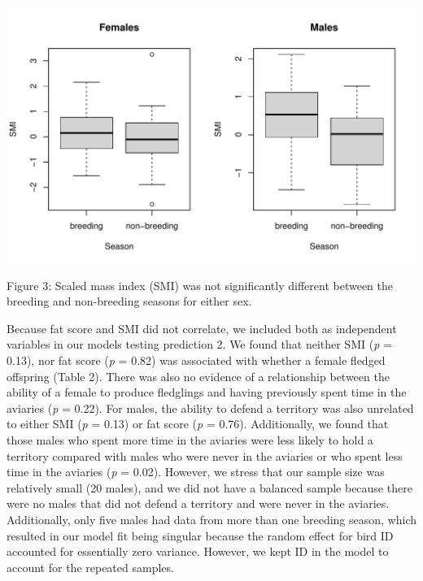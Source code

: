 \documentclass[
]{article}
\begin{document}
\includegraphics{gcondition_files/figure-latex/p2 condition and season-1.pdf}

Figure 3: Scaled mass index (SMI) was not significantly different
between the breeding and non-breeding seasons for either sex.

Because fat score and SMI did not correlate, we included both as
independent variables in our models testing prediction 2. We found that
neither SMI (\emph{p} = 0.13), nor fat score (\emph{p} = 0.82) was
associated with whether a female fledged offspring (Table 2). There was
also no evidence of a relationship between the ability of a female to
produce fledglings and having previously spent time in the aviaries
(\emph{p} = 0.22). For males, the ability to defend a territory was also
unrelated to either SMI (\emph{p} = 0.13) or fat score (\emph{p} =
0.76). Additionally, we found that those males who spent more time in
the aviaries were less likely to hold a territory compared with males
who were never in the aviaries or who spent less time in the aviaries
(\emph{p} = 0.02). However, we stress that our sample size was
relatively small (20 males), and we did not have a balanced sample
because there were no males that did not defend a territory and were
never in the aviaries. Additionally, only five males had data from more
than one breeding season, which resulted in our model fit being singular
because the random effect for bird ID accounted for essentially zero
variance. However, we kept ID in the model to account for the repeated
samples.
\end{document}
